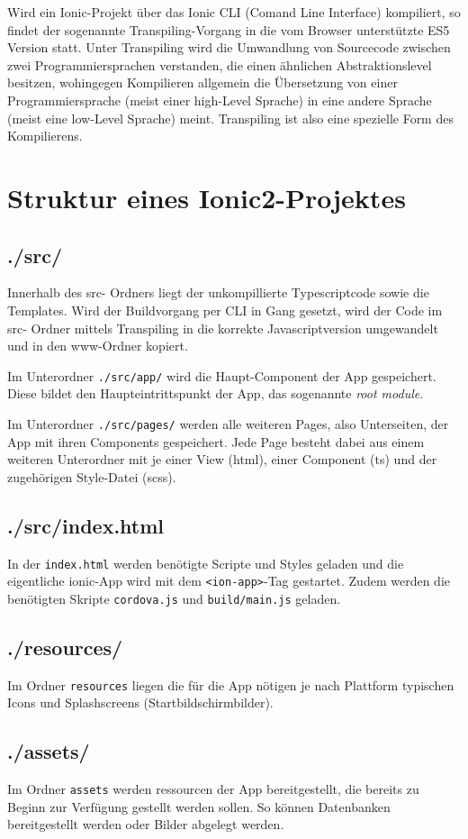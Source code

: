 Wird ein Ionic-Projekt über das Ionic CLI (Comand Line Interface) kompiliert, so findet der sogenannte Transpiling-Vorgang in die vom Browser unterstützte ES5 Version statt. Unter Transpiling wird die Umwandlung von Sourcecode zwischen zwei Programmiersprachen verstanden, die einen ähnlichen Abstraktionslevel besitzen, wohingegen Kompilieren allgemein die Übersetzung von einer Programmiersprache (meist einer high-Level Sprache) in eine andere Sprache (meist eine low-Level Sprache) meint. Transpiling ist also eine spezielle Form des Kompilierens. 
%
%
\section{Struktur eines Ionic2-Projektes}
\subsection*{./src/}
Innerhalb des src- Ordners liegt der unkompillierte Typescriptcode sowie die Templates. Wird der Buildvorgang per CLI in Gang gesetzt, wird der Code im src- Ordner mittels Transpiling in die korrekte Javascriptversion umgewandelt und in den www-Ordner kopiert.

Im Unterordner \texttt{./src/app/} wird die Haupt-Component der App gespeichert. Diese bildet den Haupteintrittspunkt der App, das sogenannte \emph{root module}.

Im Unterordner \texttt{./src/pages/} werden alle weiteren Pages, also Unterseiten, der App mit ihren Components gespeichert. Jede Page besteht dabei aus einem weiteren Unterordner mit je einer View (html), einer Component (ts) und der zugehörigen Style-Datei (scss).
%
\subsection*{./src/index.html}
In der \texttt{index.html} werden benötigte Scripte und Styles geladen und die eigentliche ionic-App wird mit dem \texttt{<ion-app>}-Tag gestartet. Zudem werden die benötigten Skripte \texttt{cordova.js} und \texttt{build/main.js} geladen.
%
\subsection*{./resources/}
Im Ordner \texttt{resources} liegen die für die App nötigen je nach Plattform typischen Icons und Splashscreens (Startbildschirmbilder). 
%
\subsection*{./assets/}
Im Ordner \texttt{assets} werden ressourcen der App bereitgestellt, die bereits zu Beginn zur Verfügung gestellt werden sollen. So können Datenbanken bereitgestellt werden oder Bilder abgelegt werden.
%